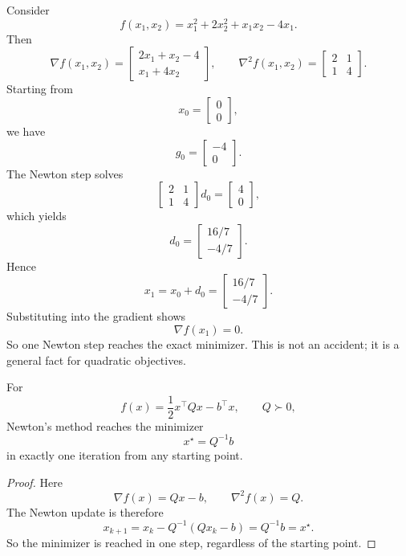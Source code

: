 \begin{eg}
	Consider
	\[
		f(x_1,x_2)=x_1^2+2x_2^2+x_1x_2-4x_1.
	\]
	Then
	\[
		\nabla f(x_1,x_2)=
		\begin{bmatrix}
			2x_1+x_2-4 \\
			x_1+4x_2
		\end{bmatrix},
		\qquad
		\nabla^2 f(x_1,x_2)=
		\begin{bmatrix}
			2 & 1 \\
			1 & 4
		\end{bmatrix}.
	\]
	Starting from
	\[
		x_0=\begin{bmatrix}0 \\ 0\end{bmatrix},
	\]
	we have
	\[
		g_0=
		\begin{bmatrix}
			-4 \\
			0
		\end{bmatrix}.
	\]
	The Newton step solves
	\[
		\begin{bmatrix}
			2 & 1 \\
			1 & 4
		\end{bmatrix}
		d_0
		=
		\begin{bmatrix}
			4 \\
			0
		\end{bmatrix},
	\]
	which yields
	\[
		d_0=
		\begin{bmatrix}
			16/7 \\
			-4/7
		\end{bmatrix}.
	\]
	Hence
	\[
		x_1=x_0+d_0=
		\begin{bmatrix}
			16/7 \\
			-4/7
		\end{bmatrix}.
	\]
	Substituting into the gradient shows
	\[
		\nabla f(x_1)=0.
	\]
	So one Newton step reaches the exact minimizer. This is not an accident; it is a general fact for quadratic objectives.
\end{eg}

\begin{proposition}\label{prop:l2-one-step-convergence-on-quadratics}
	For
	\[
		f(x)=\frac{1}{2}x^\top Qx-b^\top x,
		\qquad Q \succ 0,
	\]
	Newton's method reaches the minimizer
	\[
		x^\star=Q^{-1}b
	\]
	in exactly one iteration from any starting point.
\end{proposition}
\begin{proof}
	Here
	\[
		\nabla f(x)=Qx-b,
		\qquad
		\nabla^2 f(x)=Q.
	\]
	The Newton update is therefore
	\[
		x_{k+1}
		=
		x_k-Q^{-1}(Qx_k-b)
		=
		Q^{-1}b
		=
		x^\star.
	\]
	So the minimizer is reached in one step, regardless of the starting point.
\end{proof}

